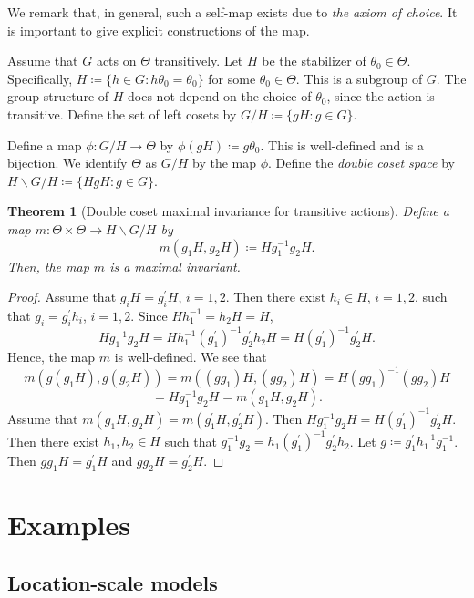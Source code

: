 \documentclass[a4paper, reqno, 11pt]{article}
\newtheorem{Thm}{Theorem}[section]
\theoremstyle{definition}
\begin{document}
We remark that, in general, such a self-map exists due to {\it the axiom of choice}. 
It is important to give explicit constructions of the map.  

Assume that $G$ acts on $\Theta$ transitively. 
Let $H$ be the stabilizer of $\theta_0 \in \Theta$. 
Specifically, $H \coloneqq  \{h \in G \colon h\theta_0 = \theta_0 \}$ for some $\theta_0 \in \Theta$. 
This is a subgroup of $G$. 
The group structure of $H$ does not depend on the choice of $\theta_0$, since the action is transitive. 
Define the set of left cosets by $G/H \coloneqq  \{gH \colon g \in G\}$. 

Define a map $\phi \colon G/H \to \Theta$ by $\phi(gH) \coloneqq  g\theta_0$. 
This is well-defined and is a bijection. 
We identify $\Theta$ as $G/H$ by the map $\phi$. 
Define the {\it double coset space} by $H \backslash G / H \coloneqq   \{HgH \colon g \in G \}$.

\begin{Thm}[Double coset maximal invariance for transitive actions]\label{thm:double-coset}
Define a map $m \colon \Theta \times \Theta \to H \backslash G / H$ by 
\[ m(g_1 H, g_2 H) \coloneqq  H g_1^{-1} g_2 H. \]
Then, the map $m$ is a maximal invariant. 
\end{Thm}

\begin{proof}
Assume that $g_i H = g_i^{\prime} H$, $i=1,2$. 
Then there exist $h_i \in H$, $i=1,2$, such that $g_i = g_i^{\prime} h_i$, $i=1,2$. 
Since $H h_1^{-1} = h_2 H = H$, 
\[ H g_1^{-1} g_2 H = H h_1^{-1} (g_1^{\prime})^{-1} g_2^{\prime} h_2 H = H (g_1^{\prime})^{-1} g_2^{\prime} H. \]
Hence, the map $m$ is well-defined. 
We see that 
\[ m(g(g_1 H), g(g_2 H)) = m((g g_1)H, (g g_2)H) = H (g g_1)^{-1} (g g_2) H\]
\[ = H g_1^{-1} g_2 H = m(g_1 H, g_2 H). \]
Assume that $m(g_1 H, g_2 H) = m(g_1^{\prime} H, g_2^{\prime} H)$. 
Then $H g_1^{-1} g_2 H = H (g_1^{\prime})^{-1} g_2^{\prime} H$. 
Then there exist $h_1, h_2 \in H$ such that $g_1^{-1} g_2 = h_1 (g_1^{\prime})^{-1} g_2^{\prime} h_2$. 
Let $g \coloneqq  g_1^{\prime} h_1^{-1} g_1^{-1}$. 
Then $g g_1 H = g_1^{\prime} H$ and $g g_2 H = g_2^{\prime} H$. 
\end{proof}


\section{Examples}

\subsection{Location-scale models}\label{sec:lsmodel}
\end{document}
